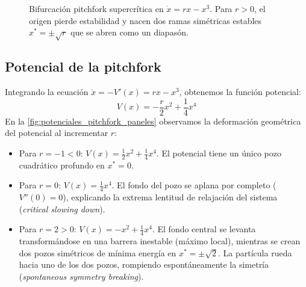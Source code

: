 \begin{figure}[htbp]
\caption{Bifurcación pitchfork supercrítica en $\dot{x} = rx - x^3$. Para $r > 0$, el origen pierde estabilidad y nacen dos ramas simétricas estables $x^* = \pm\sqrt{r}$ que se abren como un diapasón.}
\label{fig:pitchfork_supercritica_fases}
\end{figure}

\subsection{Potencial de la pitchfork}

Integrando la ecuación $\dot{x} = -V'(x) = rx - x^3$, obtenemos la función potencial:
\begin{equation}
    V(x) = -\frac{r}{2}x^2 + \frac{1}{4}x^4
    \label{eq:potencial_pitchfork_paneles}
\end{equation}
En la \cref{fig:potenciales_pitchfork_paneles} observamos la deformación geométrica del potencial al incrementar $r$:
\begin{itemize}
    \item Para $r = -1 < 0$: $V(x) = \frac{1}{2}x^2 + \frac{1}{4}x^4$. El potencial tiene un único pozo cuadrático profundo en $x^* = 0$.
    \item Para $r = 0$: $V(x) = \frac{1}{4}x^4$. El fondo del pozo se aplana por completo ($V''(0) = 0$), explicando la extrema lentitud de relajación del sistema (\emph{critical slowing down}).
    \item Para $r = 2 > 0$: $V(x) = -x^2 + \frac{1}{4}x^4$. El fondo central se levanta transformándose en una barrera inestable (máximo local), mientras se crean dos pozos simétricos de mínima energía en $x^* = \pm\sqrt{2}$. La partícula rueda hacia uno de los dos pozos, rompiendo espontáneamente la simetría (\emph{spontaneous symmetry breaking}).
\end{itemize}

